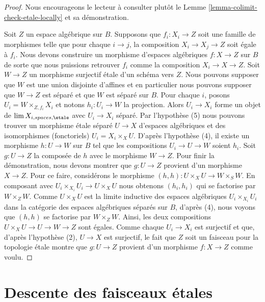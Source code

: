 \begin{proof}
Nous encourageons le lecteur à consulter plutôt
le Lemme \ref{lemma-colimit-check-etale-locally}
et sa démonstration.

\medskip\noindent
Soit $Z$ un espace algébrique sur $B$. Supposons que $f_i : X_i \to Z$ soit
une famille de morphismes telle que pour chaque $i \to j$, la composition
$X_i \to X_j \to Z$ soit égale à $f_i$. Nous devons construire un morphisme
d'espaces algébriques $f : X \to Z$ sur $B$ de sorte que nous puissions retrouver $f_i$ comme
la composition $X_i \to X \to Z$. Soit $W \to Z$ un morphisme surjectif
\'etale d'un schéma vers $Z$. Nous pouvons supposer que $W$ est une
union disjointe d'affines et en particulier nous pouvons supposer que
$W \to Z$ est séparé et que $W$ est séparé sur $B$. Pour chaque $i$, posons
$U_i = W \times_{Z, f_i} X_i$ et notons $h_i : U_i \to W$ la projection.
Alors $U_i \to X_i$ forme un objet de $\lim X_{i, spaces, \etale}$
avec $U_i \to X_i$ séparé. Par l'hypothèse (5) nous pouvons trouver un morphisme \'etale séparé $U \to X$ d'espaces algébriques et des isomorphismes (fonctoriels) $U_i = X_i \times_X U$.  
D'après l'hypothèse (4), il existe un morphisme $h : U \to W$ sur $B$ tel que les compositions $U_i \to U \to W$ soient $h_i$.  
Soit $g : U \to Z$ la composée de $h$ avec le morphisme $W \to Z$. Pour finir la démonstration, nous devons montrer que $g : U \to Z$ provient d'un morphisme $X \to Z$. Pour ce faire, considérons le morphisme $(h, h) : U \times_X U \to W \times_S W$.  
En composant avec $U_i \times_{X_i} U_i \to U \times_X U$ nous obtenons $(h_i, h_i)$ qui se factorise par $W \times_Z W$. Comme $U \times_X U$ est la limite inductive des espaces algébriques $U_i \times_{X_i} U_i$ dans la catégorie des espaces algébriques séparés sur $B$, d'après (4), nous voyons que $(h, h)$ se factorise par $W \times_Z W$. Ainsi, les deux compositions $U \times_X U \to U \to W \to Z$ sont égales. Comme chaque $U_i \to X_i$ est surjectif et que, d'après l'hypothèse (2), $U \to X$ est surjectif, le fait que $Z$ soit un faisceau pour la topologie \'etale montre que $g : U \to Z$ provient d'un morphisme $f : X \to Z$ comme voulu. 
\end{proof}





\section{Descente des faisceaux \'etales}
\label{section-glueing-etale}

